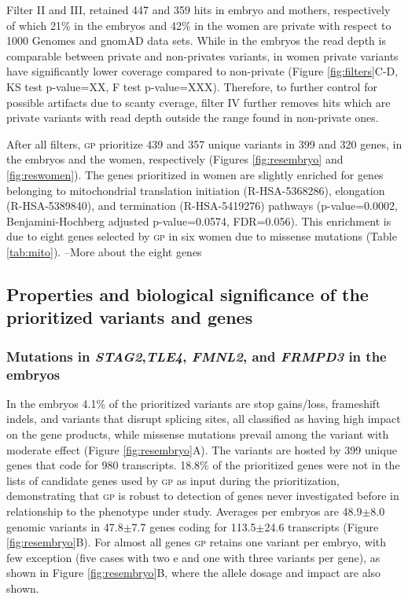 \documentclass[fleqn,10pt]{wlscirep}
\newcommand{\gp}[]{\textsc{gp }}
\begin{document}
Filter II and III, retained 447 and 359 hits in embryo and mothers, respectively of which 21\% in the embryos and 42\% in the women are private with respect to 1000 Genomes and gnomAD data sets. While in the embryos the read depth is comparable between private and non-privates variants, in women private variants have significantly lower coverage compared to non-private (Figure \ref{fig:filters}C-D, KS test p-value=XX, F test p-value=XXX). Therefore, to further control for possible artifacts due to scanty cverage, filter IV further removes hits which are private variants with read depth outside the range found in non-private ones.   

After all filters, \gp prioritize 439 and 357 unique variants in 399 and 320 genes, in the embryos and the women, respectively (Figures \ref{fig:resembryo} and \ref{fig:reswomen}). The genes prioritized in women are slightly enriched for genes belonging to mitochondrial translation initiation (R-HSA-5368286), elongation (R-HSA-5389840), and termination (R-HSA-5419276) pathways (p-value=0.0002, Benjamini-Hochberg adjusted p-value=0.0574, FDR=0.056). This enrichment is due to eight genes selected by \gp in six women due to missense mutations (Table \ref{tab:mito}).  --More about the eight genes %

\subsection*{Properties and biological significance of the prioritized variants and genes} 
\subsubsection*{Mutations in \textit{STAG2},\textit{TLE4}, \textit{FMNL2}, and \textit{FRMPD3} in the embryos} 
In the embryos 4.1\% of the prioritized variants are stop gains/loss, frameshift indels, and variants that disrupt splicing sites, all classified as having high impact on the gene products, while missense mutations prevail among the variant with moderate effect (Figure \ref{fig:resembryo}A). The variants are hosted by 399 unique genes that code for 980 transcripts. 18.8\% of the prioritized genes were not in the lists of candidate genes used by \gp as input during the prioritization, demonstrating that \gp is robust to detection of genes never investigated before in relationship to the phenotype under study. Averages per embryos are 48.9$\pm$8.0 genomic variants in 47.8$\pm$7.7 genes coding for 113.5$\pm$24.6 transcripts (Figure \ref{fig:resembryo}B). For almost all genes \gp retains one variant per embryo, with few exception (five cases with two e and one with three variants per gene), as shown in Figure \ref{fig:resembryo}B, where the allele dosage and impact are also shown. %
\end{document}
